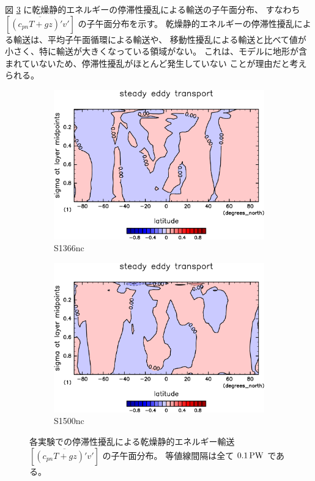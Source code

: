 \documentclass[body]{subfiles}
\begin{document}
図 \ref{乾燥静的エネルギー停滞性擾乱nc} に乾燥静的エネルギーの停滞性擾乱による輸送の子午面分布、
すなわち \([\overline{(c_{pn}T+gz)'v'}]\) の子午面分布を示す。
乾燥静的エネルギーの停滞性擾乱による輸送は、平均子午面循環による輸送や、
移動性擾乱による輸送と比べて値が小さく、特に輸送が大きくなっている領域がない。
これは、モデルに地形が含まれていないため、停滞性擾乱がほとんど発生していない
ことが理由だと考えられる。

\begin{figure}[t]
	\centering
	\begin{subfigure}{.4\textwidth}
		\centering
		\includegraphics[width=\columnwidth]{S1366-nc/MeriHeatTransTest@dryStatEn_SE,time=3650:4015-crop-rotate.pdf}
		\caption{S1366nc}\label{乾燥静的エネルギー停滞性擾乱S1366nc}
	\end{subfigure}
	\begin{subfigure}{.4\textwidth}
		\centering
		\includegraphics[width=\columnwidth]{S1500-nc/MeriHeatTransTest@dryStatEn_SE,time=3650:4015-crop-rotate.pdf}
		\caption{S1500nc}\label{乾燥静的エネルギー停滞性擾乱S1500nc}
	\end{subfigure}
	\caption[各実験でのに停滞性擾乱依る乾燥静的エネルギー輸送の子午面分布]{
		各実験での停滞性擾乱による乾燥静的エネルギー輸送 \([\overline{(c_{pn}T+gz)'v'}]\) の子午面分布。
		等値線間隔は全て \(0.1\hmu{PW}\) である。
	}\label{乾燥静的エネルギー停滞性擾乱nc}
\end{figure}
\end{document}
